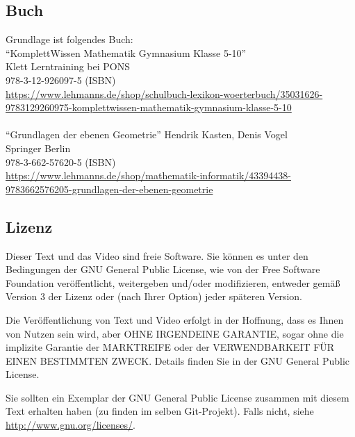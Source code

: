 \documentclass[a4paper]{amsart}
\theoremstyle{definition}
\begin{document}
\subsection*{Buch}
Grundlage ist folgendes Buch:\\

"`KomplettWissen Mathematik Gymnasium Klasse 5-10"'\\
Klett Lerntraining bei PONS\\
978-3-12-926097-5 (ISBN)\\
{\tiny
   \url{https://www.lehmanns.de/shop/schulbuch-lexikon-woerterbuch/35031626-9783129260975-komplettwissen-mathematik-gymnasium-klasse-5-10
   }
}\\
\\
"`Grundlagen der ebenen Geometrie"'
Hendrik Kasten, Denis Vogel\\
Springer Berlin\\
978-3-662-57620-5 (ISBN)\\
{\tiny
   \url{
      https://www.lehmanns.de/shop/mathematik-informatik/43394438-9783662576205-grundlagen-der-ebenen-geometrie
   }
}

\subsection*{Lizenz}
Dieser Text und das Video sind freie Software. Sie können es unter den Bedingungen der 
GNU General Public License, wie von der Free Software Foundation veröffentlicht, weitergeben 
und/oder modifizieren, entweder gemäß Version 3 der Lizenz oder (nach Ihrer Option) jeder späteren Version.

Die Veröffentlichung von Text und Video erfolgt in der Hoffnung, dass es Ihnen von Nutzen sein wird, 
aber OHNE IRGENDEINE GARANTIE, sogar ohne die implizite Garantie der MARKTREIFE oder der 
VERWENDBARKEIT FÜR EINEN BESTIMMTEN ZWECK. Details finden Sie in der GNU General Public License.

Sie sollten ein Exemplar der GNU General Public License zusammen mit diesem Text erhalten haben 
(zu finden im selben Git-Projekt). 
Falls nicht, siehe \url{http://www.gnu.org/licenses/}.
\end{document}
